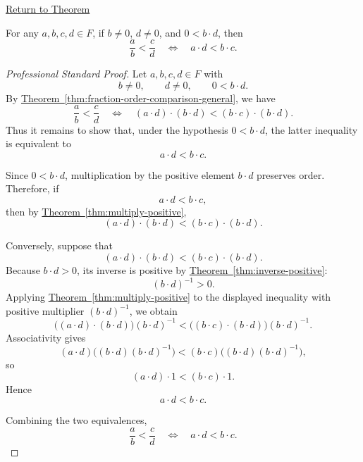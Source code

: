 \newpage
{}
\label{prf:fraction-order-comparison-positive-denominator-product}

\begin{remark*}[Return]
\hyperref[thm:fraction-order-comparison-positive-denominator-product]{Return to Theorem}
\end{remark*}

\begin{theorem*}
For any $a,b,c,d\in F$, if $b\neq 0$, $d\neq 0$, and $0<b\cdot d$, then
\[
\frac{a}{b}<\frac{c}{d}
\quad\Longleftrightarrow\quad
a\cdot d<b\cdot c.
\]
\end{theorem*}

\begin{proof}[Professional Standard Proof]
\LRAProofBodyStart
Let $a,b,c,d\in F$ with
\[
b\neq 0,\qquad d\neq 0,\qquad 0<b\cdot d.
\]
By
\hyperref[thm:fraction-order-comparison-general]{Theorem~\ref*{thm:fraction-order-comparison-general}},
we have
\[
\frac{a}{b}<\frac{c}{d}
\quad\Longleftrightarrow\quad
(a\cdot d)\cdot(b\cdot d)<(b\cdot c)\cdot(b\cdot d).
\]
Thus it remains to show that, under the hypothesis $0<b\cdot d$, the latter
inequality is equivalent to
\[
a\cdot d<b\cdot c.
\]

Since $0<b\cdot d$, multiplication by the positive element $b\cdot d$
preserves order.  Therefore, if
\[
a\cdot d<b\cdot c,
\]
then by
\hyperref[thm:multiply-positive]{Theorem~\ref*{thm:multiply-positive}},
\[
(a\cdot d)\cdot(b\cdot d)<(b\cdot c)\cdot(b\cdot d).
\]

Conversely, suppose that
\[
(a\cdot d)\cdot(b\cdot d)<(b\cdot c)\cdot(b\cdot d).
\]
Because $b\cdot d>0$, its inverse is positive by
\hyperref[thm:inverse-positive]{Theorem~\ref*{thm:inverse-positive}}:
\[
(b\cdot d)^{-1}>0.
\]
Applying
\hyperref[thm:multiply-positive]{Theorem~\ref*{thm:multiply-positive}}
to the displayed inequality with positive multiplier $(b\cdot d)^{-1}$, we
obtain
\[
\bigl((a\cdot d)\cdot(b\cdot d)\bigr)(b\cdot d)^{-1}
<
\bigl((b\cdot c)\cdot(b\cdot d)\bigr)(b\cdot d)^{-1}.
\]
Associativity gives
\[
(a\cdot d)\bigl((b\cdot d)(b\cdot d)^{-1}\bigr)
<
(b\cdot c)\bigl((b\cdot d)(b\cdot d)^{-1}\bigr),
\]
so
\[
(a\cdot d)\cdot 1<(b\cdot c)\cdot 1.
\]
Hence
\[
a\cdot d<b\cdot c.
\]

Combining the two equivalences,
\[
\frac{a}{b}<\frac{c}{d}
\quad\Longleftrightarrow\quad
a\cdot d<b\cdot c.
\]
\end{proof}

